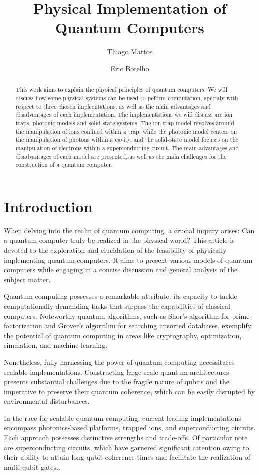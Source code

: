 \documentclass[
  journal=largetwo,
  year=2023,
]{cup-journal}
\title{Physical Implementation of Quantum Computers}
\author{Thiago Mattos}
\affiliation{Universidade Federal de Minas Gerais, Departamento de Física, Belo Horizonte, 31270-901, Minas Gerais, Brazil}
\author{Eric Botelho}
\affiliation{Universidade Federal de Minas Gerais, Departamento de Física, Belo Horizonte, 31270-901, Minas Gerais, Brazil}
\begin{document}
\begin{abstract}
  This work aims to explain the physical principles of quantum computers. We will discuss how some physical systems can be used to peform computation, specialy with respect to three chosen impleentations, as well as the main advantages and disadvantages of each implementation.
  The implementations we will discuss are ion traps, photonic models and solid state systems. The ion trap model revolves around the manipulation of ions confined within a trap, while the photonic model centers on the manipulation of photons within a cavity, and the solid-state model focuses on the manipulation of electrons within a superconducting circuit.
  The main advantages and disadvantages of each model are presented, as well as the main challenges for the construction of a quantum computer.

\end{abstract}

\section{Introduction}

When delving into the realm of quantum computing, a crucial inquiry arises: Can a quantum computer truly be realized in the physical world? This article is devoted to the exploration and elucidation of the feasibility of physically implementing quantum computers. It aims to present various models of quantum computers while engaging in a concise discussion and general analysis of the subject matter.

Quantum computing possesses a remarkable attribute: its capacity to tackle computationally demanding tasks that surpass the capabilities of classical computers. Noteworthy quantum algorithms, such as Shor's algorithm for prime factorization and Grover's algorithm for searching unsorted databases, exemplify the potential of quantum computing in areas like cryptography, optimization, simulation, and machine learning.

Nonetheless, fully harnessing the power of quantum computing necessitates scalable implementations. Constructing large-scale quantum architectures presents substantial challenges due to the fragile nature of qubits and the imperative to preserve their quantum coherence, which can be easily disrupted by environmental disturbances.

In the race for scalable quantum computing, current leading implementations encompass photonics-based platforms, trapped ions, and superconducting circuits. Each approach possesses distinctive strengths and trade-offs. Of particular note are superconducting circuits, which have garnered significant attention owing to their ability to attain long qubit coherence times and facilitate the realization of multi-qubit gates.\autocite{arute_2019_quantum}.
\end{document}
